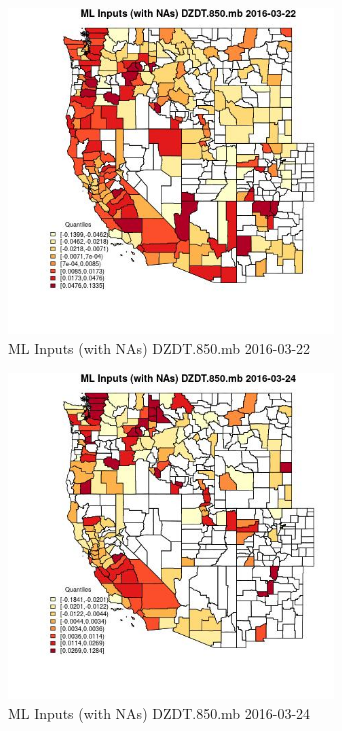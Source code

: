 \begin{figure} 
\centering  
\includegraphics[width=0.77\textwidth]{Code_Outputs/Report_ML_input_PM25_Step4_part_e_de_duplicated_aveswNAs_CountyDZDT850mbMean2016-03-22_2016-03-22.jpg} 
\caption{\label{fig:Report_ML_input_PM25_Step4_part_e_de_duplicated_aveswNAsCountyDZDT850mbMean2016-03-22_2016-03-22}ML Inputs (with NAs) DZDT.850.mb 2016-03-22} 
\end{figure} 
 

\begin{figure} 
\centering  
\includegraphics[width=0.77\textwidth]{Code_Outputs/Report_ML_input_PM25_Step4_part_e_de_duplicated_aveswNAs_CountyDZDT850mbMean2016-03-24_2016-03-24.jpg} 
\caption{\label{fig:Report_ML_input_PM25_Step4_part_e_de_duplicated_aveswNAsCountyDZDT850mbMean2016-03-24_2016-03-24}ML Inputs (with NAs) DZDT.850.mb 2016-03-24} 
\end{figure} 
 

